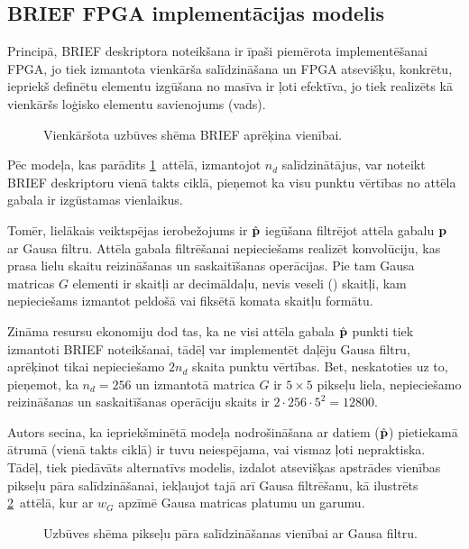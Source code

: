 \subsection{BRIEF FPGA implementācijas modelis} \label{sec:brief-fpga}
Principā,
BRIEF deskriptora noteikšana ir īpaši piemērota implementēšanai FPGA, jo
tiek izmantota vienkārša salīdzināšana un 
FPGA atsevišķu, konkrētu, iepriekš definētu elementu izgūšana
no masīva ir ļoti efektīva, jo tiek realizēts kā vienkāršs loģisko elementu 
savienojums (vads).
\begin{figure}[tbh]
	\centering
	\def\svgscale{1.1}
	{\small}
	\caption{Vienkāršota uzbūves shēma BRIEF aprēķina vienībai.}
	\label{fig:brief-fpga}
\end{figure}
Pēc modeļa, kas parādīts \ref{fig:brief-fpga}~attēlā,
izmantojot $n_d$ salīdzinātājus, var noteikt BRIEF deskriptoru
vienā takts ciklā, pieņemot ka visu punktu vērtības no attēla gabala ir 
izgūstamas vienlaikus.

Tomēr, lielākais veiktspējas ierobežojums ir $\hat{\mathbf{p}}$ iegūšana
filtrējot attēla gabalu $\mathbf{p}$ ar Gausa filtru. Attēla gabala filtrēšanai
nepieciešams realizēt konvolūciju, kas prasa lielu skaitu reizināšanas un
saskaitīšanas operācijas. Pie tam Gausa matricas $G$ elementi ir skaitļi
ar decimāldaļu, nevis veseli () skaitļi, kam nepieciešams
izmantot peldošā vai fiksētā komata skaitļu formātu.

\label{C:selective-gauss}
Zināma resursu ekonomiju dod tas, ka ne visi attēla gabala $\hat{\mathbf{p}}$
punkti tiek izmantoti BRIEF noteikšanai, tādēļ var implementēt daļēju Gausa
filtru, aprēķinot tikai nepieciešamo $2n_d$ skaita punktu vērtības.
Bet, neskatoties uz to,
pieņemot, ka $n_d = 256$ un izmantotā matrica $G$ ir $5 \times 5$ pikseļu
liela, nepieciešamo reizināšanas un saskaitīšanas operāciju skaits ir
$2\cdot 256 \cdot 5^2 = 12800$.

Autors secina, ka iepriekšminētā modeļa nodrošināšana ar datiem
($\hat{\mathbf{p}}$) pietiekamā ātrumā (vienā takts ciklā) ir tuvu neiespējama,
vai vismaz ļoti nepraktiska. Tādēļ, tiek piedāvāts alternatīvs modelis,
izdalot atsevišķas apstrādes vienības pikseļu pāra salīdzināšanai, iekļaujot
tajā arī Gausa filtrēšanu, kā ilustrēts \ref{fig:gauss+brief}~attēlā, kur
ar $w_G$ apzīmē Gausa matricas platumu un garumu.
\begin{figure}[tbh]
	\centering
	\def\svgscale{1.3}
	{\small}
	\caption{Uzbūves shēma pikseļu pāra salīdzināšanas vienībai ar Gausa filtru.}
	\label{fig:gauss+brief}
\end{figure}

